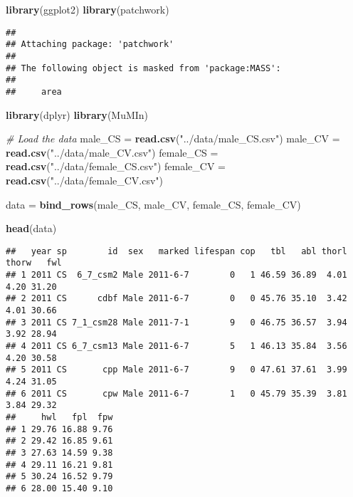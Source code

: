 \documentclass[
]{article}
\newenvironment{Shaded}{\begin{snugshade}}{\end{snugshade}}
\newcommand{\CommentTok}[1]{\textcolor[rgb]{0.56,0.35,0.01}{\textit{#1}}}
\newcommand{\FunctionTok}[1]{\textcolor[rgb]{0.13,0.29,0.53}{\textbf{#1}}}
\newcommand{\NormalTok}[1]{#1}
\newcommand{\OtherTok}[1]{\textcolor[rgb]{0.56,0.35,0.01}{#1}}
\newcommand{\StringTok}[1]{\textcolor[rgb]{0.31,0.60,0.02}{#1}}
\begin{document}
\begin{Shaded}
\begin{Highlighting}[]
\FunctionTok{library}\NormalTok{(ggplot2)}
\FunctionTok{library}\NormalTok{(patchwork)}
\end{Highlighting}
\end{Shaded}

\begin{verbatim}
## 
## Attaching package: 'patchwork'
## 
## The following object is masked from 'package:MASS':
## 
##     area
\end{verbatim}

\begin{Shaded}
\begin{Highlighting}[]
\FunctionTok{library}\NormalTok{(dplyr)}
\FunctionTok{library}\NormalTok{(MuMIn)}

\CommentTok{\# Load the data}
\NormalTok{male\_CS }\OtherTok{=} \FunctionTok{read.csv}\NormalTok{(}\StringTok{"../data/male\_CS.csv"}\NormalTok{)}
\NormalTok{male\_CV }\OtherTok{=} \FunctionTok{read.csv}\NormalTok{(}\StringTok{"../data/male\_CV.csv"}\NormalTok{)}
\NormalTok{female\_CS }\OtherTok{=} \FunctionTok{read.csv}\NormalTok{(}\StringTok{"../data/female\_CS.csv"}\NormalTok{)}
\NormalTok{female\_CV }\OtherTok{=} \FunctionTok{read.csv}\NormalTok{(}\StringTok{"../data/female\_CV.csv"}\NormalTok{)}

\NormalTok{data }\OtherTok{=} \FunctionTok{bind\_rows}\NormalTok{(male\_CS, male\_CV, female\_CS, female\_CV)}

\FunctionTok{head}\NormalTok{(data)}
\end{Highlighting}
\end{Shaded}

\begin{verbatim}
##   year sp        id  sex   marked lifespan cop   tbl   abl thorl thorw   fwl
## 1 2011 CS  6_7_csm2 Male 2011-6-7        0   1 46.59 36.89  4.01  4.20 31.20
## 2 2011 CS      cdbf Male 2011-6-7        0   0 45.76 35.10  3.42  4.01 30.66
## 3 2011 CS 7_1_csm28 Male 2011-7-1        9   0 46.75 36.57  3.94  3.92 28.94
## 4 2011 CS 6_7_csm13 Male 2011-6-7        5   1 46.13 35.84  3.56  4.20 30.58
## 5 2011 CS       cpp Male 2011-6-7        9   0 47.61 37.61  3.99  4.24 31.05
## 6 2011 CS       cpw Male 2011-6-7        1   0 45.79 35.39  3.81  3.84 29.32
##     hwl   fpl  fpw
## 1 29.76 16.88 9.76
## 2 29.42 16.85 9.61
## 3 27.63 14.59 9.38
## 4 29.11 16.21 9.81
## 5 30.24 16.52 9.79
## 6 28.00 15.40 9.10
\end{verbatim}
\end{document}
